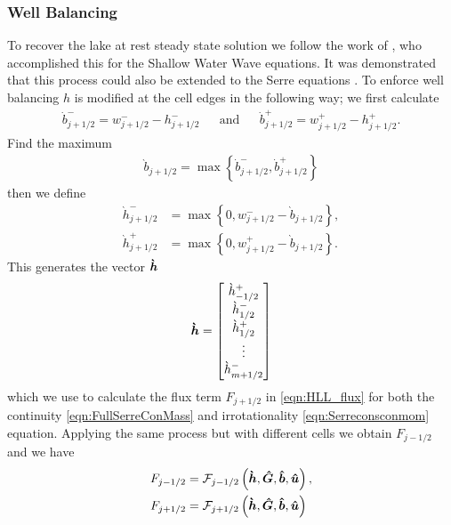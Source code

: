 \subsubsection{Well Balancing}
To recover the lake at rest steady state solution we follow the work of \citet{Klein-etal-2004-2050}, who accomplished this for the Shallow Water Wave equations. It was demonstrated that this process could also be extended to the Serre equations \cite{Pitt-J-2014}. To enforce well balancing $h$ is modified at the cell edges in the following way; we first calculate
\begin{align}
\dot{b}^-_{j+1/2} = w^-_{j+1/2} - h^-_{j+1/2} & &\text{and}& &\dot{b}^+_{j+1/2} = w^+_{j+1/2} - h^+_{j+1/2}.
\label{eqn:BedReDefWmH}
\end{align}
Find the maximum
\begin{align*}
\grave{b}_{j+1/2} = \max\left\lbrace\dot{b}^-_{j+1/2} , \dot{b}^+_{j+1/2} \right\rbrace
\end{align*}
then we define
\begin{subequations}
\begin{align}
\grave{h}^-_{j+1/2} &= \max\left\lbrace 0, w^-_{j+1/2} - \grave{b}_{j+1/2}  \right\rbrace, \\  \grave{h}^+_{j+1/2} &= \max\left\lbrace 0, w^+_{j+1/2} - \grave{b}_{j+1/2} \right\rbrace.
\end{align}
\label{eqn:ModifiedHValue}
\end{subequations}
This generates the vector $\boldsymbol{\grave{h}}$
\begin{equation*}
\boldsymbol{\grave{h}}= \begin{bmatrix}
\grave{h}^+_{-1/2} \\ \grave{h}^-_{1/2}  \\ \grave{h}^+_{1/2}  \\ \vdots \\ \grave{h}^-_{m + 1/2} \end{bmatrix}
\end{equation*}
which we use to calculate the flux term $F_{j+1/2}$ in \eqref{eqn:HLL_flux} for both the continuity \eqref{eqn:FullSerreConMass} and irrotationality \eqref{eqn:Serreconsconmom} equation. Applying the same process but with different cells we obtain $F_{j-1/2}$ and we have
\begin{subequations}
\begin{align}	
F_{j-1/2} &=\mathcal{F}_{j-1/2} \left(\boldsymbol{\grave{h}}, \boldsymbol{\hat{G}},\boldsymbol{\hat{b}}, \boldsymbol{\hat{u}}  \right),\\
F_{j+1/2} &=\mathcal{F}_{j+1/2} \left(\boldsymbol{\grave{h}}, \boldsymbol{\hat{G}},\boldsymbol{\hat{b}}, \boldsymbol{\hat{u}}  \right)
\label{eqn:FluxFEVM}
\end{align}
\end{subequations}


